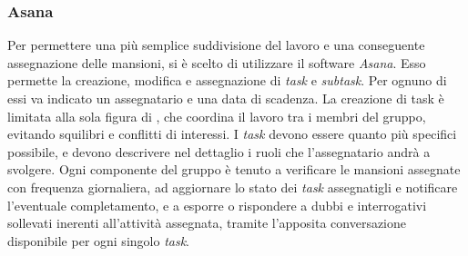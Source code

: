 		\subsubsection{Asana}
		Per permettere una più semplice suddivisione del lavoro e una conseguente assegnazione delle mansioni, si è scelto di utilizzare il software \textit{Asana}. Esso permette la creazione, modifica e assegnazione di \textit{task} e \textit{subtask}. Per ognuno di essi va indicato un assegnatario e una data di scadenza. La creazione di task è limitata alla sola figura di \textit{\RdP}, che coordina il lavoro tra i membri del gruppo, evitando squilibri e conflitti di interessi. I \textit{task} devono essere quanto più specifici possibile, e devono descrivere nel dettaglio i ruoli che l'assegnatario andrà a svolgere. Ogni componente del gruppo è tenuto a verificare le mansioni assegnate con frequenza giornaliera, ad aggiornare lo stato dei \textit{task} assegnatigli e notificare l'eventuale completamento, e a esporre o rispondere a dubbi e interrogativi sollevati inerenti all'attività assegnata, tramite l'apposita conversazione disponibile per ogni singolo \textit{task}.